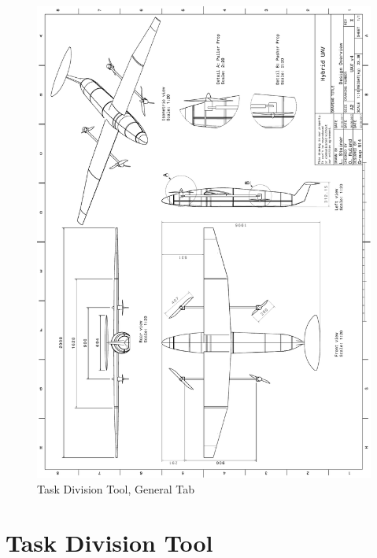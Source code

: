 \begin{figure}[H]
    \centering
    \includegraphics[width=\textwidth]{Appendices/Figures/overview_A4}
    \caption{Task Division Tool, General Tab}
    \label{fig:overview_A4}
\end{figure}




\chapter{Task Division Tool}
\setlength{\parindent}{15pt}
\label{ch:task_divi}

